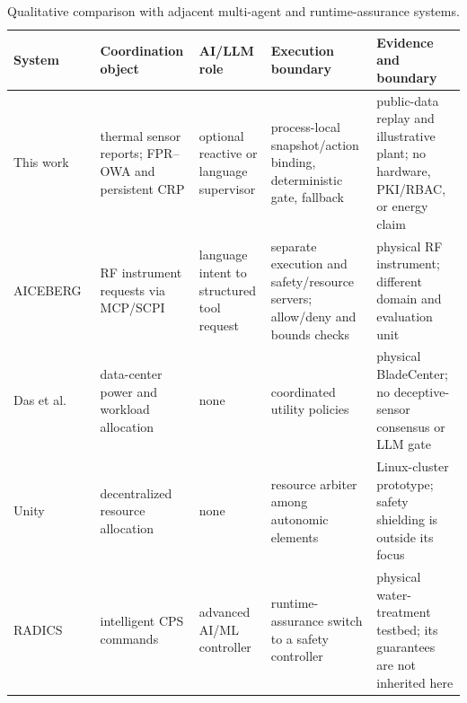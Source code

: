 \begin{table}[H]
\centering
\caption{Qualitative comparison with adjacent multi-agent and runtime-assurance systems.}
\label{tab:comparison}
\scriptsize
\begin{tabularx}{\textwidth}{P{0.13\textwidth}P{0.19\textwidth}P{0.19\textwidth}P{0.20\textwidth}Y}
\toprule
\textbf{System} & \textbf{Coordination object} & \textbf{AI/LLM role} & \textbf{Execution boundary} & \textbf{Evidence and boundary}\\
\midrule
This work & thermal sensor reports; FPR--OWA and persistent CRP & optional reactive or language supervisor & process-local snapshot/action binding, deterministic gate, fallback & public-data replay and illustrative plant; no hardware, PKI/RBAC, or energy claim\\
AICEBERG~\cite{popescu2026aiceberg} & RF instrument requests via MCP/SCPI & language intent to structured tool request & separate execution and safety/resource servers; allow/deny and bounds checks & physical RF instrument; different domain and evaluation unit\\
Das et al.~\cite{das2008} & data-center power and workload allocation & none & coordinated utility policies & physical BladeCenter; no deceptive-sensor consensus or LLM gate\\
Unity~\cite{tesauro2004} & decentralized resource allocation & none & resource arbiter among autonomic elements & Linux-cluster prototype; safety shielding is outside its focus\\
RADICS~\cite{wheatman2022radics} & intelligent CPS commands & advanced AI/ML controller & runtime-assurance switch to a safety controller & physical water-treatment testbed; its guarantees are not inherited here\\
\bottomrule
\end{tabularx}
\end{table}
